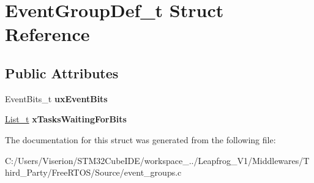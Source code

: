 \hypertarget{struct_event_group_def__t}{}\section{Event\+Group\+Def\+\_\+t Struct Reference}
\label{struct_event_group_def__t}
\subsection*{Public Attributes}
\begin{DoxyCompactItemize}
\item 
\mbox{\label{struct_event_group_def__t_ab1bcd95a3330b71c55198b2352926643}} 
Event\+Bits\+\_\+t {\bfseries ux\+Event\+Bits}
\item 
\mbox{\label{struct_event_group_def__t_a3dd347560456bfe452415efb52760dc3}} 
\mbox{\hyperlink{structx_l_i_s_t}{List\+\_\+t}} {\bfseries x\+Tasks\+Waiting\+For\+Bits}
\end{DoxyCompactItemize}


The documentation for this struct was generated from the following file\+:\begin{DoxyCompactItemize}
\item 
C\+:/\+Users/\+Viserion/\+S\+T\+M32\+Cube\+I\+D\+E/workspace\+\_../\+Leapfrog\+\_\+\+V1/\+Middlewares/\+Third\+\_\+\+Party/\+Free\+R\+T\+O\+S/\+Source/event\+\_\+groups.\+c\end{DoxyCompactItemize}
